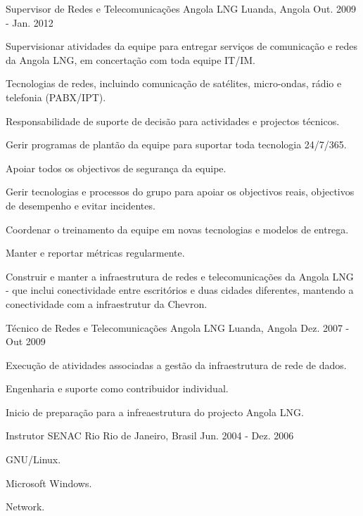 \begin{cventries}
\cventry
{Supervisor de Redes e Telecomunicações} %
{Angola LNG} %
{Luanda, Angola} %
{Out. 2009 - Jan. 2012} %
{ %
\begin{cvitems}
\item {Supervisionar atividades da equipe para entregar serviços de comunicação e redes da Angola LNG, em concertação com toda equipe IT/IM.}
\item {Tecnologias de redes, incluindo comunicação de satélites, micro-ondas, rádio e telefonia (PABX/IPT).}
\item {Responsabilidade de suporte de decisão para actividades e projectos técnicos.}
\item {Gerir programas de plantão da equipe para suportar toda tecnologia 24/7/365.}
\item {Apoiar todos os objectivos de segurança da equipe.}
\item {Gerir tecnologias e processos do grupo para apoiar os objectivos reais, objectivos de desempenho e evitar incidentes.}
\item {Coordenar o treinamento da equipe em novas tecnologias e modelos de entrega.}
\item {Manter e reportar métricas regularmente.}
\item {Construir e manter a infraestrutura de redes e telecomunicações da Angola LNG - que inclui conectividade entre escritórios e duas cidades diferentes, mantendo a conectividade com a infraestrutur da Chevron.}
\end{cvitems} 
}


\cventry
{Técnico de Redes e Telecomunicações} %
{Angola LNG} %
{Luanda, Angola} %
{Dez. 2007 - Out 2009} %
{ %
\begin{cvitems}
\item {Execução de atividades associadas a gestão da infraestrutura de rede de dados.}
\item {Engenharia e suporte como contribuidor individual.}
\item {Inicio de preparação para a infreaestrutura do projecto Angola LNG.}
\end{cvitems}
}


\cventry
{Instrutor} %
{SENAC Rio} %
{Rio de Janeiro, Brasil} %
{Jun. 2004 - Dez. 2006} %
{ %
\begin{cvitems}
\item {GNU/Linux.}
\item {Microsoft Windows.}
\item {Network.}
\end{cvitems}
}


\end{cventries}
